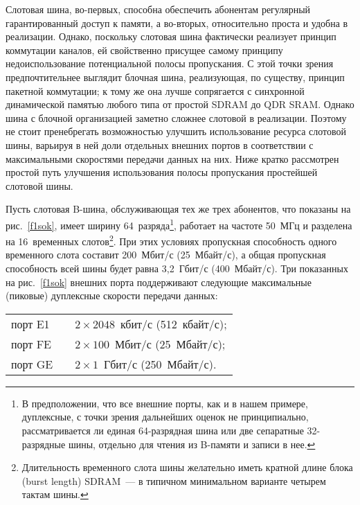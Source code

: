 \begin{multicols}{2}
    Слотовая шина, во-первых, способна обеспечить абонентам регулярный гарантированный
доступ к памяти, а во-вторых, относительно проста и удобна в реализации. Однако, поскольку
слотовая шина фактически реализует принцип коммутации каналов, ей свойственно присущее
самому принципу недоиспользование потенциальной полосы пропускания. С этой точки зрения
предпочтительнее выглядит блочная шина, реализующая, по существу, принцип пакетной
коммутации; к тому же она лучше сопрягается с синхронной динамической памятью любого
типа от простой SDRAM до QDR SRAM. Однако шина с блочной организацией заметно
сложнее слотовой в реализации. Поэтому не стоит пренебрегать возможностью улучшить
использование ресурса слотовой шины, варьируя в ней доли отдельных внешних портов в
соответствии с максимальными скоростями передачи данных на них. Ниже кратко рассмотрен
простой путь улучшения использования полосы пропускания простейшей слотовой шины.

    Пусть слотовая B-шина, обслуживающая тех же трех абонентов, что показаны на
рис.~\ref{f1sok}, имеет ширину 64~разряда\footnote{В предположении, что все внешние порты, как и в
нашем примере, дуплексные, с точки зрения дальнейших оценок не принципиально, рассматривается ли единая
    64-разрядная шина или две сепаратные 32-разрядные шины, отдельно для чтения из B-памяти и записи в нее.},
работает на частоте 50~МГц и разделена на 16~временных слотов\footnote{Длительность
временного слота шины желательно иметь кратной длине блока (burst length) SDRAM~--- в типичном минимальном
варианте четырем тактам шины.}. При этих условиях пропускная способность одного временного
слота составит 200~Мбит/с (25~Мбайт/с), а общая пропускная способность всей шины будет
равна 3,2~Гбит/с (400~Мбайт/с). Три показанных на рис.~\ref{f1sok} внешних порта
поддерживают следующие максимальные (пиковые) дуплексные скорости передачи данных:
\begin{center}
\begin{tabular}{lp{0.5mm}l}
порт E1 &&$2\times 2048$~кбит/с (512~кбайт/с);\\
порт FE && $2 \times 100$~Мбит/с (25~Мбайт/с);\\
порт GE && $2 \times 1$~Гбит/с   (250~Мбайт/с).
\end{tabular}
\end{center}


\end{multicols}

